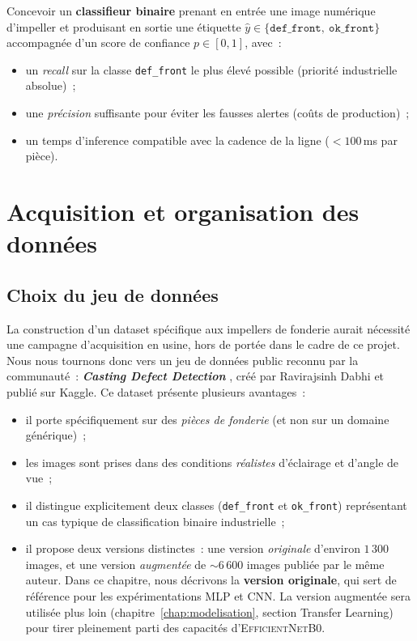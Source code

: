 \documentclass[12pt,a4paper,openany]{report}
\begin{document}
\begin{infobox}[title=Formulation opérationnelle]
Concevoir un \textbf{classifieur binaire} prenant en entrée une image numérique d'impeller et produisant en sortie une étiquette $\hat{y} \in \{\texttt{def\_front},\ \texttt{ok\_front}\}$ accompagnée d'un score de confiance $p \in [0,1]$, avec~:
\begin{itemize}
    \item un \emph{recall} sur la classe \texttt{def\_front} le plus élevé possible (priorité industrielle absolue)~;
    \item une \emph{précision} suffisante pour éviter les fausses alertes (coûts de production)~;
    \item un temps d'inference compatible avec la cadence de la ligne ($<100$\,ms par pièce).
\end{itemize}
\end{infobox}


\chapter{Acquisition et organisation des données}
\label{chap:donnees}

\section{Choix du jeu de données}

La construction d'un dataset spécifique aux impellers de fonderie aurait nécessité une campagne d'acquisition en usine, hors de portée dans le cadre de ce projet. Nous nous tournons donc vers un jeu de données public reconnu par la communauté~: \textbf{\emph{Casting Defect Detection}} \cite{dabhi2020casting}, créé par Ravirajsinh Dabhi et publié sur Kaggle. Ce dataset présente plusieurs avantages~:
\begin{itemize}
    \item il porte spécifiquement sur des \emph{pièces de fonderie} (et non sur un domaine générique)~;
    \item les images sont prises dans des conditions \emph{réalistes} d'éclairage et d'angle de vue~;
    \item il distingue explicitement deux classes (\texttt{def\_front} et \texttt{ok\_front}) représentant un cas typique de classification binaire industrielle~;
    \item il propose deux versions distinctes~: une version \emph{originale} d'environ $1\,300$ images, et une version \emph{augmentée} de $\sim 6\,600$ images publiée par le même auteur. Dans ce chapitre, nous décrivons la \textbf{version originale}, qui sert de référence pour les expérimentations MLP et CNN. La version augmentée sera utilisée plus loin (chapitre~\ref{chap:modelisation}, section Transfer Learning) pour tirer pleinement parti des capacités d'\textsc{EfficientNetB0}.
\end{itemize}
\end{document}
